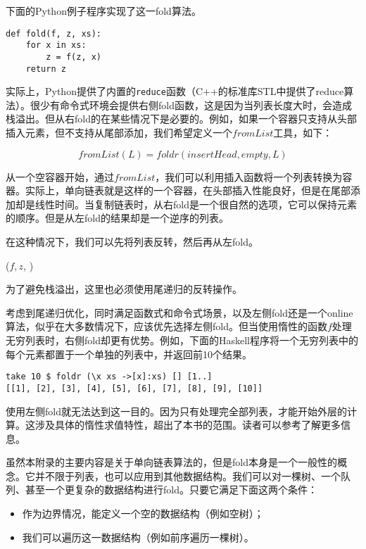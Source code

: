 \documentclass[UTF8]{article}
\begin{document}
下面的Python例子程序实现了这一fold算法。

\lstset{language=Python}
\begin{lstlisting}
def fold(f, z, xs):
    for x in xs:
        z = f(z, x)
    return z
\end{lstlisting}

实际上，Python提供了内置的\texttt{reduce}函数（C++的标准库STL中提供了reduce算法）。很少有命令式环境会提供右侧fold函数，这是因为当列表长度大时，会造成栈溢出。但从右fold的在某些情况下是必要的。例如，如果一个容器只支持从头部插入元素，但不支持从尾部添加，我们希望定义一个$fromList$工具，如下：

\[
fromList(L) = foldr(insertHead, empty, L)
\]

从一个空容器开始，通过$fromList$，我们可以利用插入函数将一个列表转换为容器。实际上，单向链表就是这样的一个容器，在头部插入性能良好，但是在尾部添加却是线性时间。当复制链表时，从右fold是一个很自然的选项，它可以保持元素的顺序。但是从左fold的结果却是一个逆序的列表。

在这种情况下，我们可以先将列表反转，然后再从左fold。

\begin{algorithmic}[1]
  \State \Return {}($f, z$, )
\EndFunction
\end{algorithmic}

为了避免栈溢出，这里也必须使用尾递归的反转操作。

考虑到尾递归优化，同时满足函数式和命令式场景，以及左侧fold还是一个online算法，似乎在大多数情况下，应该优先选择左侧fold。但当使用惰性的函数$f$处理无穷列表时，右侧fold却更有优势。例如，下面的Haskell程序将一个无穷列表中的每个元素都置于一个单独的列表中，并返回前10个结果。

\lstset{language=Haskell}
\begin{lstlisting}
take 10 $ foldr (\x xs ->[x]:xs) [] [1..]
[[1], [2], [3], [4], [5], [6], [7], [8], [9], [10]]
\end{lstlisting} %

使用左侧fold就无法达到这一目的。因为只有处理完全部列表，才能开始外层的计算。这涉及具体的惰性求值特性，超出了本书的范围。读者可以参考\cite{Haskell-wiki}了解更多信息。

虽然本附录的主要内容是关于单向链表算法的，但是fold本身是一个一般性的概念。它并不限于列表，也可以应用到其他数据结构。我们可以对一棵树、一个队列、甚至一个更复杂的数据结构进行fold。只要它满足下面这两个条件：

\begin{itemize}
\item 作为边界情况，能定义一个空的数据结构（例如空树）；
\item 我们可以遍历这一数据结构（例如前序遍历一棵树）。
\end{itemize}
\end{document}
